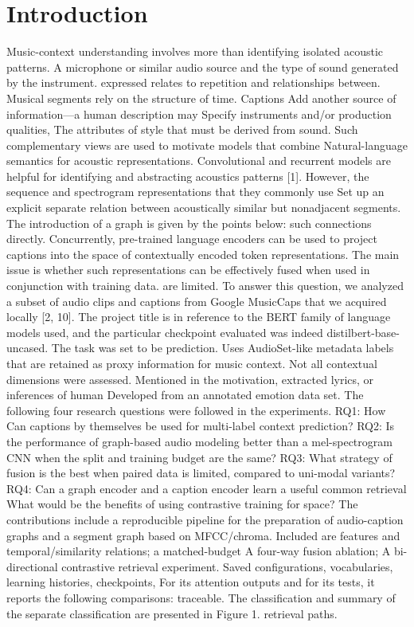 \documentclass[10pt,twocolumn,letterpaper]{article}
\begin{document}
\section{Introduction}
Music-context understanding involves more than identifying isolated acoustic patterns. A microphone or similar audio source and the type of sound generated by the instrument. expressed relates to repetition and relationships between. Musical segments rely on the structure of time. Captions Add another source of information---a human description may Specify instruments and/or production qualities, The attributes of style that must be derived from sound. Such complementary views are used to motivate models that combine Natural-language semantics for acoustic representations. Convolutional and recurrent models are helpful for identifying and abstracting acoustics patterns [1]. However, the sequence and spectrogram representations that they commonly use Set up an explicit separate relation between acoustically similar but nonadjacent segments. The introduction of a graph is given by the points below: such connections directly. Concurrently, pre-trained language encoders can be used to project captions into the space of contextually encoded token representations. The main issue is whether such representations can be effectively fused when used in conjunction with training data. are limited. To answer this question, we analyzed a subset of audio clips and captions from Google MusicCaps that we acquired locally [2, 10]. The project title is in reference to the BERT family of language models used, and the particular checkpoint evaluated was indeed distilbert-base-uncased. The task was set to be prediction. Uses AudioSet-like metadata labels that are retained as proxy information for music context. Not all contextual dimensions were assessed. Mentioned in the motivation, extracted lyrics, or inferences of human Developed from an annotated emotion data set. The following four research questions were followed in the experiments. RQ1: How Can captions by themselves be used for multi-label context prediction? RQ2: Is the performance of graph-based audio modeling better than a mel-spectrogram CNN when the split and training budget are the same? RQ3: What strategy of fusion is the best when paired data is limited, compared to uni-modal variants? RQ4: Can a graph encoder and a caption encoder learn a useful common retrieval What would be the benefits of using contrastive training for space? The contributions include a reproducible pipeline for the preparation of audio-caption graphs and a segment graph based on MFCC/chroma. Included are features and temporal/similarity relations; a matched-budget A four-way fusion ablation; A bi-directional contrastive retrieval experiment. Saved configurations, vocabularies, learning histories, checkpoints, For its attention outputs and for its tests, it reports the following comparisons: traceable. The classification and summary of the separate classification are presented in Figure 1. retrieval paths.
\end{document}
